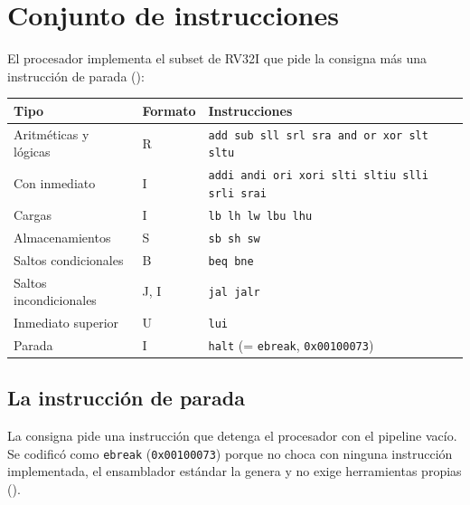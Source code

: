 \section{Conjunto de instrucciones}
\label{sec:isa}

El procesador implementa el subset de RV32I que pide la consigna más una instrucción de parada
():

\begin{center}
\small
\begin{tabular}{@{}l l l@{}}
  \toprule
  \textbf{Tipo} & \textbf{Formato} & \textbf{Instrucciones} \\
  \midrule
  Aritméticas y lógicas    & R & \texttt{add sub sll srl sra and or xor slt sltu} \\
  Con inmediato            & I & \texttt{addi andi ori xori slti sltiu slli srli srai} \\
  Cargas                   & I & \texttt{lb lh lw lbu lhu} \\
  Almacenamientos          & S & \texttt{sb sh sw} \\
  Saltos condicionales     & B & \texttt{beq bne} \\
  Saltos incondicionales   & J, I & \texttt{jal jalr} \\
  Inmediato superior       & U & \texttt{lui} \\
  Parada                   & I & \texttt{halt} (= \texttt{ebreak}, \texttt{0x00100073}) \\
  \bottomrule
\end{tabular}
\end{center}


\subsection{La instrucción de parada}
\label{sec:halt}

La consigna pide una instrucción que detenga el procesador con el pipeline vacío. Se codificó como
\texttt{ebreak} (\texttt{0x00100073}) porque no choca con ninguna instrucción implementada, el
ensamblador estándar la genera y no exige herramientas propias ().

